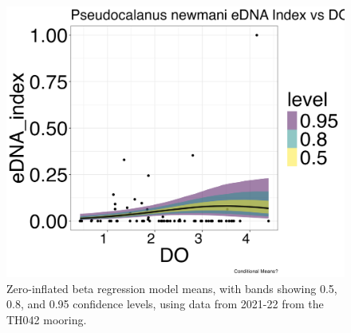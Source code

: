 \documentclass[12pt,twoside]{reedthesis}
\begin{document}
{\begin{figure}[h]
\begin{center}
			\includegraphics[scale=0.25]{Pnewmani_ZOIB_Means_noOut}
			\caption[Zero-inflated beta regression means]{\footnotesize{Zero-inflated beta regression model means, with bands showing 0.5, 0.8, and 0.95 confidence levels, using data from 2021-22 from the TH042 mooring.}} %
			\label{ZOIB}
		\end{center}
	\end{figure}
	
}
\end{document}
